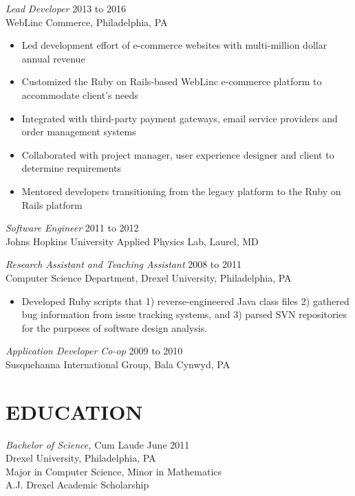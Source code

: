 \documentclass[line]{res}
\begin{document}
\begin{resume}
{\sl Lead Developer} \hfill 2013 to 2016 \\
WebLinc Commerce, Philadelphia, PA
\begin{itemize} \itemsep -2pt
\item Led development effort of e-commerce websites with multi-million dollar annual revenue
\item Customized the Ruby on Rails-based WebLinc e-commerce platform to accommodate client's needs
\item Integrated with third-party payment gateways, email service providers and order management systems
\item Collaborated with project manager, user experience designer and client to determine requirements
\item Mentored developers transitioning from the legacy platform to the Ruby on Rails platform
\end{itemize}

{\sl Software Engineer} \hfill 2011 to 2012 \\
Johns Hopkins University Applied Physics Lab, Laurel, MD

{\sl Research Assistant and Teaching Assistant} \hfill 2008 to 2011 \\
Computer Science Department, Drexel University, Philadelphia, PA
\begin{itemize}  \itemsep -2pt
\item Developed Ruby scripts that 1) reverse-engineered Java class files 2) gathered bug information from issue tracking systems, and 3) parsed SVN repositories for the purposes of software design analysis.
\end{itemize}

{\sl Application Developer Co-op} \hfill        2009 to 2010 \\
Susquehanna International Group, Bala Cynwyd, PA

\section{EDUCATION}
{\sl Bachelor of Science,} Cum Laude \hfill June 2011 \\
Drexel University, Philadelphia, PA \\
Major in Computer Science, Minor in Mathematics \\
A.J. Drexel Academic Scholarship

\end{resume}
\end{document}
